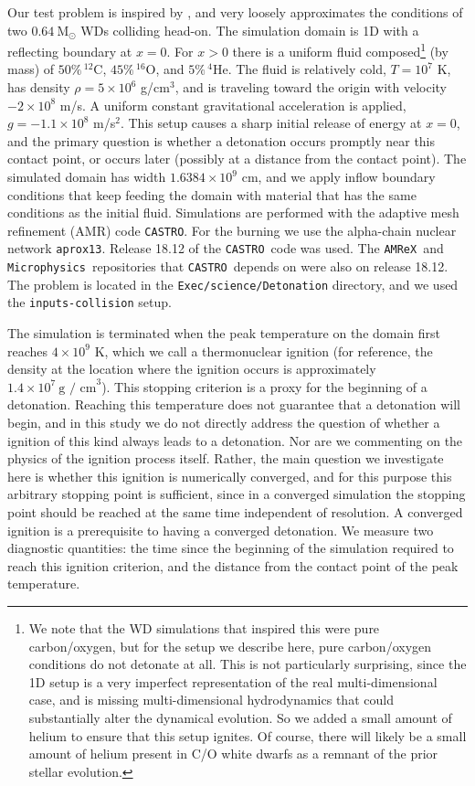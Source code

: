 \documentclass[twocolumn,numberedappendix,trackchanges]{../aastex62}
\newcommand{\msolar}{\mathrm{M}_\odot}
\newcommand{\amrex}{\texttt{AMReX}}
\newcommand{\castro}{\texttt{CASTRO}}
\newcommand{\microphysics}{\texttt{Microphysics}}
\begin{document}
Our test problem is inspired by \cite{kushnir:2013}, and very loosely approximates the
conditions of two $0.64\ \msolar$ WDs colliding head-on. The simulation domain is 1D with a
reflecting boundary at $x = 0$. For $x > 0$ there is a uniform fluid composed\footnote{
We note that the WD simulations that inspired this were pure carbon/oxygen,
but for the setup we describe here, pure carbon/oxygen conditions do not detonate at all.
This is not particularly surprising, since the 1D setup is a very imperfect representation
of the real multi-dimensional case, and is missing multi-dimensional hydrodynamics that could
substantially alter the dynamical evolution. So we added a small amount of helium to ensure
that this setup ignites. Of course, there will likely be a small amount of helium present in
C/O white dwarfs as a remnant of the prior stellar evolution.} (by mass)
of $50\%\, ^{12}$C, $45\%\, ^{16}$O, and $5\%\, ^{4}$He.   The fluid is relatively cold,
$T = 10^7$ K, has density $\rho = 5 \times 10^6$ g/cm$^3$, and is traveling toward the
origin with velocity $-2 \times 10^8$ m/s. A uniform constant gravitational acceleration
is applied, $g = -1.1 \times 10^8$ m/s$^{2}$. This setup causes a sharp initial release
of energy at $x = 0$, and the primary question is whether a detonation occurs promptly
near this contact point, or occurs later (possibly at a distance from the contact point).
The simulated domain has width $1.6384 \times 10^9$ cm, and we apply inflow boundary conditions
that keep feeding the domain with material that has the same conditions as the initial fluid.
Simulations are performed with the adaptive mesh refinement (AMR) code \castro.
For the burning we use the alpha-chain nuclear network \texttt{aprox13}.
Release 18.12 of the \castro\ code was used. The \amrex\ and \microphysics\ repositories
that \castro\ depends on were also on release 18.12. The problem is located in the
\texttt{Exec/science/Detonation} directory, and we used the \texttt{inputs-collision} setup.

The simulation is terminated when the peak temperature on the domain first reaches
$4 \times 10^9$ K, which we call a thermonuclear ignition (for reference, the
density at the location where the ignition occurs is approximately $1.4\times 10^7\ \text{g / cm}^3$). This stopping criterion is a
proxy for the beginning of a detonation. Reaching this temperature does not guarantee
that a detonation will begin, and in this study we do not directly address the question
of whether a ignition of this kind always leads to a detonation. Nor are we commenting
on the physics of the ignition process itself. Rather, the main question
we investigate here is whether this ignition is numerically converged, and for this purpose
this arbitrary stopping point is sufficient, since in a converged simulation the stopping point
should be reached at the same time independent of resolution. A converged ignition
is a prerequisite to having a converged detonation. We measure two diagnostic quantities:
the time since the beginning of the simulation required to reach this ignition criterion,
and the distance from the contact point of the peak temperature.
\end{document}

